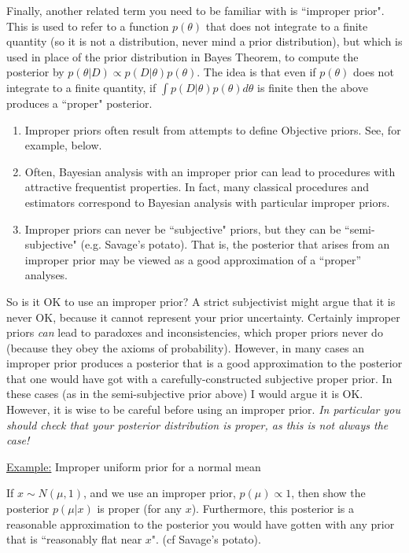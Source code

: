 \documentclass[12pt]{article}
\def\ni{\noindent}
\begin{document}
Finally, another related term you need to be familiar with is ``improper prior". This is used to refer to a function $p(\theta)$ that does not integrate to a finite quantity (so it is not a distribution, never mind a prior distribution), but which is used in place of the prior distribution in Bayes Theorem, to compute the posterior by
$p(\theta | D) \propto p(D|\theta) p(\theta)$. 
The idea is that even if $p(\theta)$ does not integrate to a finite quantity,
if $\int p(D|\theta) p(\theta) d\theta$ is finite then
the above produces a ``proper" posterior. 
\begin{enumerate}
\item Improper priors often result from attempts to define Objective priors. See, for example, below.
\item  Often, Bayesian analysis with an improper prior can lead to
  procedures with attractive frequentist properties.  In fact, many
  classical procedures and estimators correspond to Bayesian analysis
  with particular improper priors.
\item Improper priors can never be ``subjective" priors, but they can be ``semi-subjective" (e.g. Savage's potato). That is, the posterior that arises from an improper prior may be viewed as a good approximation of a
  ``proper'' analyses.
\end{enumerate}

So is it OK to use an improper prior? A strict subjectivist  might argue that it is never OK, because it cannot represent your prior uncertainty.
Certainly improper priors {\it can} lead to paradoxes and inconsistencies, which proper priors never do
(because they obey the axioms of probability).
 However, in many cases an improper prior produces a posterior that is a good approximation to the posterior that one would have got with a carefully-constructed
subjective proper prior. In these cases (as in the semi-subjective prior above) I would argue it is OK. However, it is wise to be careful before using an improper prior. {\it In particular you should check that your posterior distribution is proper, as this is not always the case!}

\ni\underline{Example:} Improper uniform prior for a normal mean

If $x \sim N(\mu,1)$, and we use an improper prior, $p(\mu) \propto 1$, then show the posterior $p(\mu | x)$ is proper (for any $x$). Furthermore, this posterior is a reasonable approximation to the posterior you would have gotten with any prior that is ``reasonably flat near $x$". (cf Savage's potato).
\end{document}
